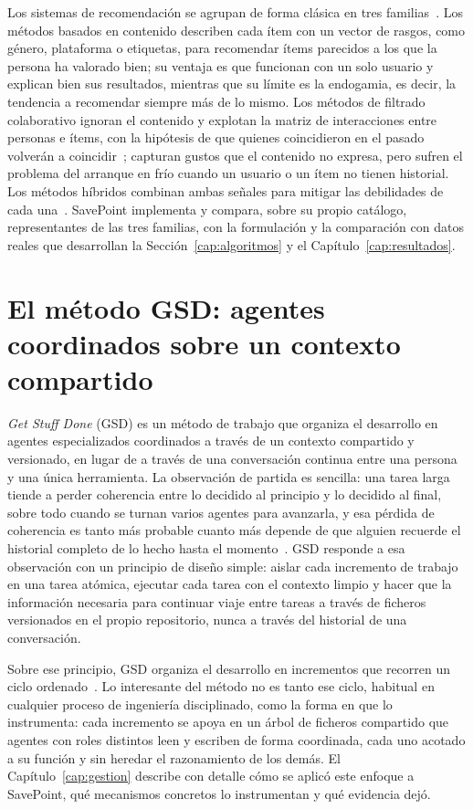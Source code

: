 Los sistemas de recomendación se agrupan de forma clásica en tres familias~\cite{ricci2022handbook,
aggarwal2016recommender}. Los métodos basados en contenido describen cada ítem con un vector
de rasgos, como género, plataforma o etiquetas, para recomendar ítems parecidos a los que la
persona ha valorado bien; su ventaja es que funcionan con un solo usuario y explican bien sus
resultados, mientras que su límite es la endogamia, es decir, la tendencia a recomendar
siempre más de lo mismo. Los métodos de filtrado colaborativo ignoran el contenido y explotan
la matriz de interacciones entre personas e ítems, con la hipótesis de que quienes
coincidieron en el pasado volverán a coincidir~\cite{adomavicius2005toward}; capturan gustos
que el contenido no expresa, pero sufren el problema del arranque en frío cuando un usuario o
un ítem no tienen historial. Los métodos híbridos combinan ambas señales para mitigar las
debilidades de cada una~\cite{burke2002hybrid}. SavePoint implementa y compara, sobre su propio
catálogo, representantes de las tres familias, con la formulación y la comparación con datos
reales que desarrollan la Sección~\ref{cap:algoritmos} y el Capítulo~\ref{cap:resultados}.

\section{El método GSD: agentes coordinados sobre un contexto compartido}\label{sec:arte-agentes}

\textit{Get Stuff Done} (GSD) es un método de trabajo que organiza el desarrollo en agentes
especializados coordinados a través de un contexto compartido y versionado, en lugar de a
través de una conversación continua entre una persona y una única herramienta. La observación
de partida es sencilla: una tarea larga tiende a perder coherencia entre lo decidido al
principio y lo decidido al final, sobre todo cuando se turnan varios agentes para avanzarla, y
esa pérdida de coherencia es tanto más probable cuanto más depende de que alguien recuerde el
historial completo de lo hecho hasta el momento~\cite{anthropic-context}. GSD responde a esa
observación con un principio de diseño simple: aislar cada incremento de trabajo en una tarea
atómica, ejecutar cada tarea con el contexto limpio y hacer que la información necesaria para
continuar viaje entre tareas a través de ficheros versionados en el propio repositorio, nunca a
través del historial de una conversación.

Sobre ese principio, GSD organiza el desarrollo en incrementos que recorren un ciclo ordenado~\cite{gsd}. Lo interesante del método no
es tanto ese ciclo, habitual en cualquier proceso de ingeniería disciplinado, como la forma en
que lo instrumenta: cada incremento se apoya en un árbol de ficheros compartido que agentes con
roles distintos leen y escriben de forma coordinada, cada uno acotado a su función
y sin heredar el razonamiento de los demás. El
Capítulo~\ref{cap:gestion} describe con detalle cómo se aplicó este enfoque a SavePoint, qué
mecanismos concretos lo instrumentan y qué evidencia dejó.
